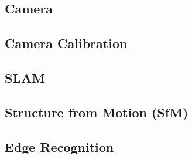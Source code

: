 \subsection{Camera}
\subsection{Camera Calibration}
\subsection{SLAM}
\subsection{Structure from Motion (SfM)}
\subsection{Edge Recognition}